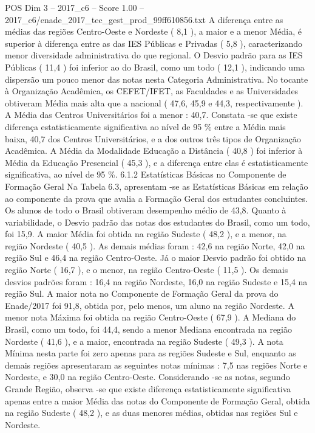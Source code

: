 \begin{textsample}{POS Dim 3 – 2017\_c6 – Score 1.00 – 2017\_c6/enade\_2017\_tec\_gest\_prod\_99ff610856.txt}
A diferença entre as médias das regiões Centro-Oeste e Nordeste ( 8,1 ), a maior e a menor Média, é superior à diferença entre as das IES Públicas e Privadas ( 5,8 ), caracterizando menor diversidade administrativa do que regional.
O Desvio padrão para as IES Públicas ( 11,4 ) foi inferior ao do Brasil, como um todo ( 12,1 ), indicando uma dispersão um pouco menor das notas nesta Categoria Administrativa.
No tocante à Organização Acadêmica, os CEFET/IFET, as Faculdades e as Universidades obtiveram Média mais alta que a nacional ( 47,6, 45,9 e 44,3, respectivamente ).
A Média das Centros Universitários foi a menor : 40,7.
Constata -se que existe diferença estatisticamente significativa ao nível de 95 \% entre a Média mais baixa, 40,7 dos Centros Universitários, e a dos outros três tipos de Organização Acadêmica.
A Média da Modalidade Educação a Distância ( 40,8 ) foi inferior à Média da Educação Presencial ( 45,3 ), e a diferença entre elas é estatisticamente significativa, ao nível de 95 \%. 6.1.2 Estatísticas Básicas no Componente de Formação Geral Na Tabela 6.3, apresentam -se as Estatísticas Básicas em relação ao componente da prova que avalia a Formação Geral dos estudantes concluintes.
Os alunos de todo o Brasil obtiveram desempenho médio de 43,8.
Quanto à variabilidade, o Desvio padrão das notas dos estudantes do Brasil, como um todo, foi 15,9.
A maior Média foi obtida na região Sudeste ( 48,2 ), e a menor, na região Nordeste ( 40,5 ).
As demais médias foram : 42,6 na região Norte, 42,0 na região Sul e 46,4 na região Centro-Oeste.
Já o maior Desvio padrão foi obtido na região Norte ( 16,7 ), e o menor, na região Centro-Oeste ( 11,5 ).
Os demais desvios padrões foram : 16,4 na região Nordeste, 16,0 na região Sudeste e 15,4 na região Sul.
A maior nota no Componente de Formação Geral da prova do Enade/2017 foi 91,8, obtida por, pelo menos, um aluno na região Nordeste.
A menor nota Máxima foi obtida na região Centro-Oeste ( 67,9 ).
A Mediana do Brasil, como um todo, foi 44,4, sendo a menor Mediana encontrada na região Nordeste ( 41,6 ), e a maior, encontrada na região Sudeste ( 49,3 ).
A nota Mínima nesta parte foi zero apenas para as regiões Sudeste e Sul, enquanto as demais regiões apresentaram as seguintes notas mínimas : 7,5 nas regiões Norte e Nordeste, e 30,0 na região Centro-Oeste.
Considerando -se as notas, segundo Grande Região, observa -se que existe diferença estatisticamente significativa apenas entre a maior Média das notas do Componente de Formação Geral, obtida na região Sudeste ( 48,2 ), e as duas menores médias, obtidas nas regiões Sul e Nordeste.

\end{textsample}
